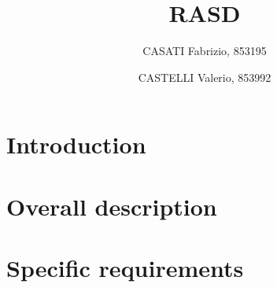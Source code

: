 




\title{RASD}
\author{
	CASATI Fabrizio, 853195
	\and
	CASTELLI Valerio, 853992
}

\maketitle
\tableofcontents

\chapter{Introduction}


\chapter{Overall description}


\chapter{Specific requirements}


